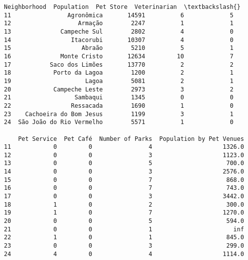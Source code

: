 \documentclass[11pt]{article}
\makeatletter
\newcommand{\boxspacing}{\kern\kvtcb@left@rule\kern\kvtcb@boxsep}
\newcommand{\prompt}[4]{
        \ttfamily\llap{{\color{#2}[#3]:\hspace{3pt}#4}}\vspace{-\baselineskip}
    }
\makeatother
\begin{document}
            \begin{tcolorbox}[breakable, size=fbox, boxrule=.5pt, pad at break*=1mm, opacityfill=0]
\prompt{Out}{outcolor}{28}{\boxspacing}
\begin{Verbatim}[commandchars=\\\{\}]
                Neighborhood  Population  Pet Store  Veterinarian  \textbackslash{}
11                Agronômica       14591          6             5
12                   Armação        2247          1             1
13              Campeche Sul        2802          4             0
14                 Itacorubi       10307          4             0
15                    Abraão        5210          5             1
16              Monte Cristo       12634         10             7
17           Saco dos Limões       13770          2             2
18            Porto da Lagoa        1200          2             1
19                     Lagoa        5081          2             1
20            Campeche Leste        2973          3             2
21                  Sambaqui        1345          0             0
22                 Ressacada        1690          1             0
23    Cachoeira do Bom Jesus        1199          3             1
24  São João do Rio Vermelho        5571          1             0

    Pet Service  Pet Café  Number of Parks  Population by Pet Venues
11            0         0                4                    1326.0
12            0         0                3                    1123.0
13            0         0                5                     700.0
14            0         0                3                    2576.0
15            0         0                7                     868.0
16            0         0                7                     743.0
17            0         0                3                    3442.0
18            1         0                2                     300.0
19            1         0                7                    1270.0
20            0         0                5                     594.0
21            0         0                1                       inf
22            1         0                1                     845.0
23            0         0                3                     299.0
24            4         0                4                    1114.0
\end{Verbatim}
\end{tcolorbox}
        
\end{document}
